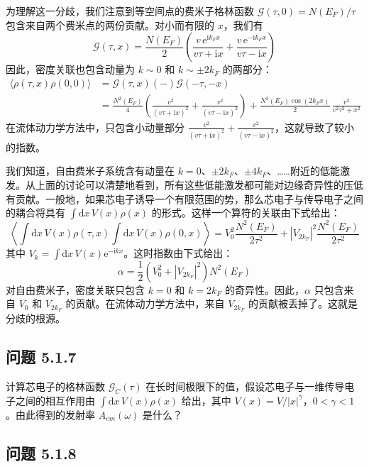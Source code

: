 为理解这一分歧，我们注意到等空间点的费米子格林函数 $\mathcal{G}(\tau,0)=N(E_F)/\tau$ 包含来自两个费米点的两份贡献。对小而有限的 $x$，我们有
\begin{equation*}
\mathcal{G}(\tau,x)=\frac{N(E_F)}{2}\left(\frac{v\,\mathrm{e}^{\mathrm{i}k_Fx}}{v\tau+\mathrm{i}x}+\frac{v\,\mathrm{e}^{-\mathrm{i}k_Fx}}{v\tau-\mathrm{i}x}\right)
\end{equation*}
因此，密度关联也包含动量为 $k\sim0$ 和 $k\sim\pm2k_F$ 的两部分：
\begin{align*}
\langle\rho(\tau,x)\rho(0,0)\rangle &= \mathcal{G}(\tau,x)(-)\mathcal{G}(-\tau,-x)\\
&= \frac{N^2(E_F)}{4}\left(\frac{v^2}{(v\tau+\mathrm{i}x)^2}+\frac{v^2}{(v\tau-\mathrm{i}x)^2}\right)+\frac{N^2(E_F)\cos(2k_Fx)}{2}\,\frac{v^2}{v^2\tau^2+x^2}
\end{align*}
在流体动力学方法中，只包含小动量部分 $\frac{v^2}{(v\tau+\mathrm{i}x)^2}+\frac{v^2}{(v\tau-\mathrm{i}x)^2}$，这就导致了较小的指数。

我们知道，自由费米子系统含有动量在 $k=0$、$\pm2k_F$、$\pm4k_F$、……附近的低能激发。从上面的讨论可以清楚地看到，所有这些低能激发都可能对边缘奇异性的压低有贡献。一般地，如果芯电子诱导一个有限范围的势，那么芯电子与传导电子之间的耦合将具有 $\int\mathrm{d}x\,V(x)\rho(x)$ 的形式。这样一个算符的关联由下式给出：
\begin{equation*}
\left\langle\int\mathrm{d}x\,V(x)\rho(\tau,x)\int\mathrm{d}x\,V(x)\rho(0,x)\right\rangle=V_0^2\frac{N^2(E_F)}{2\tau^2}+|V_{2k_F}|^2\frac{N^2(E_F)}{2\tau^2}
\end{equation*}
其中 $V_k=\int\mathrm{d}x\,V(x)\mathrm{e}^{-\mathrm{i}kx}$。这时指数由下式给出：
\begin{equation*}
\alpha=\frac{1}{2}(V_0^2+|V_{2k_F}|^2)N^2(E_F)
\end{equation*}
对自由费米子，密度关联只包含 $k=0$ 和 $k=2k_F$ 的奇异性。因此，$\alpha$ 只包含来自 $V_0$ 和 $V_{2k_F}$ 的贡献。在流体动力学方法中，来自 $V_{2k_F}$ 的贡献被丢掉了。这就是分歧的根源。

\subsection*{问题 5.1.7}

计算芯电子的格林函数 $\mathcal{G}_C(\tau)$ 在长时间极限下的值，假设芯电子与一维传导电子之间的相互作用由 $\int\mathrm{d}x\,V(x)\rho(x)$ 给出，其中 $V(x)=V/|x|^{\gamma}$，$0<\gamma<1$。由此得到的发射率 $A_{em}(\omega)$ 是什么？

\subsection*{问题 5.1.8}

